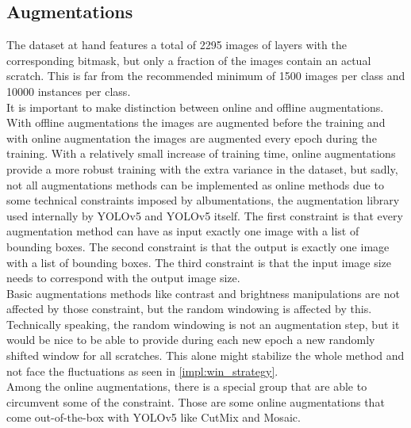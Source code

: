\subsection{Augmentations}
The dataset at hand features a total of 2295 images of layers with the corresponding bitmask, but only a fraction of the images contain an actual scratch. This is far from the recommended minimum of 1500 images per class and 10000 instances per class. \\
It is important to make distinction between online and offline augmentations. With offline augmentations the images are augmented before the training and with online augmentation the images are augmented every epoch during the training. With a relatively small increase of training time, online augmentations provide a more robust training with the extra variance in the dataset, but sadly, not all augmentations methods can be implemented as online methods due to some technical constraints imposed by albumentations, the augmentation library used internally by YOLOv5 and YOLOv5 itself. The first constraint is that every augmentation method can have as input exactly one image with a list of bounding boxes. The second constraint is that the output is exactly one image with a list of bounding boxes. The third constraint is that the input image size needs to correspond with the output image size. \\
Basic augmentations methods like contrast and brightness manipulations are not affected by those constraint, but the random windowing is affected by this. Technically speaking, the random windowing is not an augmentation step, but it would be nice to be able to provide during each new epoch a new randomly shifted window for all scratches. This alone might stabilize the whole method and not face the fluctuations as seen in \ref{impl:win_strategy}.\\
Among the online augmentations, there is a special group that are able to circumvent some of the constraint. Those are some online augmentations that come out-of-the-box with YOLOv5 like CutMix and Mosaic. \\

